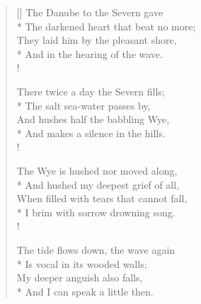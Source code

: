 \documentclass[MAIN]{subfiles}
\begin{document}
\settowidth{\versewidth}{The chestnut pattering to the ground:}
\begin{verse}[\versewidth]
The {\sc Danube} to the {\sc Severn} gave\\*
\vin The darkened heart that beat no more;\\
\vin They laid him by the pleasant shore,\\*
And in the hearing of the wave.\\!

There twice a day the {\sc Severn} fills;\\*
\vin The salt sea-water passes by,\\
\vin And hushes half the babbling {\sc Wye},\\*
And makes a silence in the hills.\\!

The {\sc Wye} is hushed nor moved along,\\*
\vin And hushed my deepest grief of all,\\
\vin When filled with tears that cannot fall,\\*
I brim with sorrow drowning song.\\!

The tide flows down, the wave again\\*
\vin Is vocal in its wooded walls;\\
\vin My deeper anguish also falls,\\*
And I can speak a little then.
\end{verse}
\end{document}
